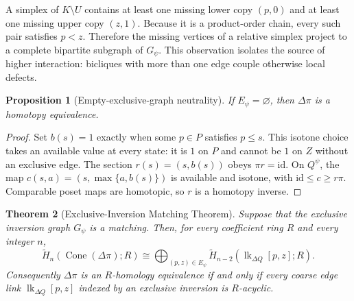 \documentclass[11pt]{article}
\newtheorem{theorem}{Theorem}[section]
\newtheorem{proposition}[theorem]{Proposition}
\newcommand{\Cone}{\operatorname{Cone}}
\begin{document}
A simplex of $K\setminus U$ contains at least one missing lower copy $(p,0)$
and at least one missing upper copy $(z,1)$.  Because it is a product-order
chain, every such pair satisfies $p<z$.  Therefore the missing vertices of a
relative simplex project to a complete bipartite subgraph of $G_\psi$.  This
observation isolates the source of higher interaction: bicliques with more than
one edge couple otherwise local defects.

\begin{proposition}[Empty-exclusive-graph neutrality]
\label{prop:empty-exclusive}
If $E_\psi=\varnothing$, then $\Delta\pi$ is a homotopy equivalence.
\end{proposition}
\begin{proof}
Set $b(s)=1$ exactly when some $p\in P$ satisfies $p\le s$.
This isotone choice takes an available value at every state: it is $1$ on $P$
and cannot be $1$ on $Z$ without an exclusive edge.  The section
$r(s)=(s,b(s))$ obeys $\pi r=\mathrm{id}$.
On $Q^\psi$, the map $c(s,a)=(s,\max\{a,b(s)\})$ is available and isotone,
with $\mathrm{id}\le c\ge r\pi$.  Comparable poset maps are homotopic,
so $r$ is a homotopy inverse.
\end{proof}

\begin{theorem}[Exclusive-Inversion Matching Theorem]
\label{thm:exclusive-matching}
Suppose that the exclusive inversion graph $G_\psi$ is a matching.  Then, for
every coefficient ring $R$ and every integer $n$,
\begin{equation}
\widetilde H_n\!\left(\Cone(\Delta\pi);R\right)
\cong
\bigoplus_{(p,z)\in E_\psi}
\widetilde H_{n-2}\!\left(
\operatorname{lk}_{\Delta Q}[p,z];R
\right).
\label{eq:exclusive-matching}
\end{equation}
Consequently $\Delta\pi$ is an $R$-homology equivalence if and only if every
coarse edge link $\operatorname{lk}_{\Delta Q}[p,z]$ indexed by an exclusive
inversion is $R$-acyclic.
\end{theorem}
\end{document}
